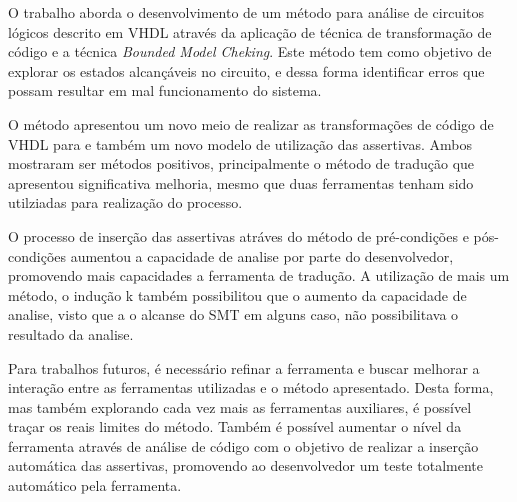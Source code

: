 \label{chapter:consideracoes}
O trabalho aborda o desenvolvimento de um método para análise de circuitos lógicos descrito em VHDL através da aplicação de técnica de transformação de código e a técnica \textit{Bounded Model Cheking}. Este método tem como objetivo de explorar os estados alcançáveis no circuito, e dessa forma identificar erros que possam resultar em mal funcionamento do sistema.

\par
O método apresentou um novo meio de realizar as transformações de código de VHDL para e também um novo modelo de utilização das assertivas. Ambos mostraram ser métodos positivos, principalmente o método de tradução que apresentou significativa melhoria, mesmo que duas ferramentas tenham sido utilziadas para realização do processo.

\par
O processo de inserção das assertivas atráves do método de pré-condições e pós-condições aumentou a capacidade de analise por parte do desenvolvedor, promovendo mais capacidades a ferramenta de tradução. A utilização de mais um método, o indução k também possibilitou que o aumento da capacidade de analise, visto que a o alcanse do SMT em alguns caso, não possibilitava o resultado da analise.

\par
Para trabalhos futuros, é necessário refinar a ferramenta e buscar melhorar a interação entre as ferramentas utilizadas e o método apresentado. Desta forma, mas também explorando cada vez mais as ferramentas auxiliares, é possível traçar os reais limites do método. Também é possível aumentar o nível da ferramenta através de análise de código com o objetivo de realizar a inserção automática das assertivas, promovendo ao desenvolvedor um teste totalmente automático pela ferramenta.

\par

 